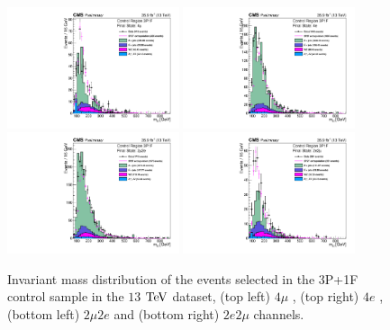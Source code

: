 \begin{figure}[!htb]
\begin{center}
    {\includegraphics [width=0.45\textwidth] {Figures/RedBkg/HZZ_3P1Fuw_ZZMass_4m.pdf}}
    {\includegraphics [width=0.45\textwidth] {Figures/RedBkg/HZZ_3P1Fuw_ZZMass_4e.pdf}} \\
    {\includegraphics [width=0.45\textwidth] {Figures/RedBkg/HZZ_3P1Fuw_ZZMass_2m2e.pdf}}
    {\includegraphics [width=0.45\textwidth] {Figures/RedBkg/HZZ_3P1Fuw_ZZMass_2e2m.pdf}} \\
\caption{
Invariant mass distribution of the events selected in the 3P+1F control sample in the
$13$ $\mathrm{Te\kern -0.1em V}$ dataset, (top left)  $4\mu$ , (top right) $4e$ , (bottom left)  $2\mu2e$ and (bottom right)  $2e2\mu$ channels.
}
\label{fig:CR_3P1F}
\end{center}
\end{figure}

